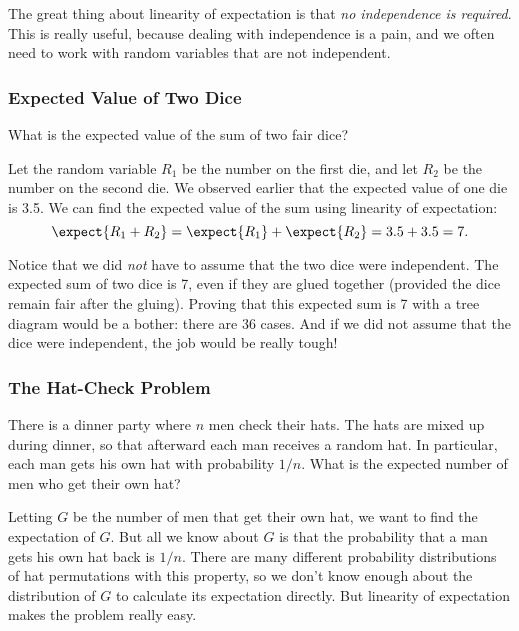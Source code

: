 The great thing about linearity of expectation is that \emph{no
independence is required}.  This is really useful, because dealing with
independence is a pain, and we often need to work with random variables
that are not independent.

\iffalse Even when the random variables \emph{are} independent, we know
from previous experience that proving independence requires a lot of
work.\fi


\subsubsection{Expected Value of Two Dice}

What is the expected value of the sum of two fair dice?

Let the random variable $R_1$ be the number on the first die, and let
$R_2$ be the number on the second die.  We observed earlier that the
expected value of one die is 3.5.  We can find the expected value of the
sum using linearity of expectation:
\begin{equation*}
\expect{R_1 + R_2} 
 =   \expect{R_1} + \expect{R_2}
 =    3.5 + 3.5
 =    7.
\end{equation*}

Notice that we did {\em not} have to assume that the two dice were
independent.  The expected sum of two dice is 7, even if they are glued
together (provided the dice remain fair after the gluing).  Proving that
this expected sum is 7 with a tree diagram would be a bother: there are 36
cases.  And if we did not assume that the dice were independent, the job
would be really tough!

\subsubsection{The Hat-Check Problem}

There is a dinner party where $n$ men check their hats.  The hats are
mixed up during dinner, so that afterward each man receives a random hat.
In particular, each man gets his own hat with probability $1/n$.  What is
the expected number of men who get their own hat?

Letting $G$ be the number of men that get their own hat, we want to find
the expectation of $G$.  But all we know about $G$ is that the probability
that a man gets his own hat back is $1/n$.  There are many different
probability distributions of hat permutations with this property, so we
don't know enough about the distribution of $G$ to calculate its
expectation directly.  But linearity of expectation makes the problem
really easy.

